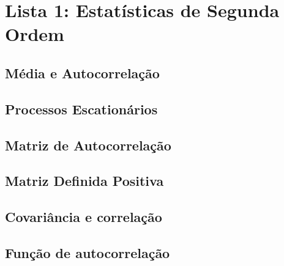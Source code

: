 \section{Lista 1: Estatísticas de Segunda Ordem}

\subsection{Média e Autocorrelação}



\subsection{Processos Escationários}

\subsection{Matriz de Autocorrelação}

\subsection{Matriz Definida Positiva}

\subsection{Covariância e correlação}

\subsection{Função de autocorrelação}